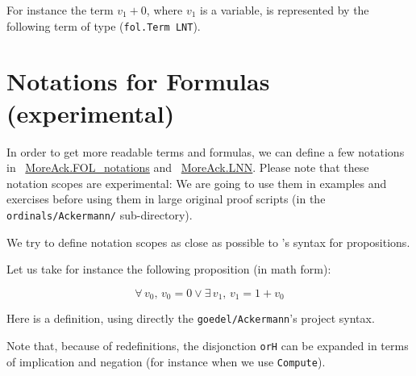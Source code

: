 










For instance the term $v_1+0$, where $v_1$ is a variable,
is represented by the following \gallina term of type 
(\texttt{fol.Term LNT}).








\section{Notations for Formulas (experimental)}

In order to get more readable terms and formulas, we can define a few notations in ~\href{../theories/html/hydras.MoreAck.FOL_notations.html}{MoreAck.FOL\_notations} and
~\href{../theories/html/hydras.MoreAck.LNN.html}{MoreAck.LNN}.
Please note that these notation scopes are experimental: We are going to use them in examples and exercises before using them in large original proof scripts (in the \texttt{ordinals/Ackermann/} sub-directory).

We try to define notation scopes as close as possible to \coq's syntax for propositions.

Let us take for instance the following proposition (in math form):

$$\forall\, v_0,\, v_0=0\vee \exists\,v_1,\,v_1=1+v_0$$

Here is a definition, using directly the \texttt{goedel/Ackermann}'s project syntax.


Note that, because of redefinitions, the disjonction \texttt{orH}
can be expanded in terms of  implication and negation (for instance when we use \texttt{Compute}).

